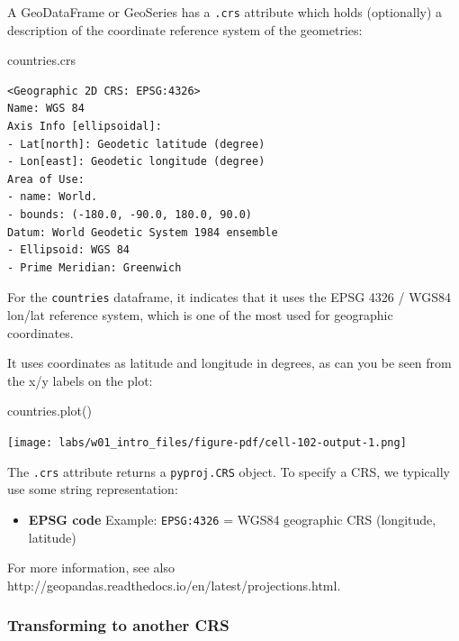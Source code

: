 \documentclass[
  letterpaper,
  DIV=11,
  numbers=noendperiod]{scrreprt}
\newenvironment{Shaded}{\begin{snugshade}}{\end{snugshade}}
\newcommand{\NormalTok}[1]{\textcolor[rgb]{0.00,0.23,0.31}{#1}}
\providecommand{\tightlist}{%
  \setlength{\itemsep}{0pt}\setlength{\parskip}{0pt}}\usepackage{longtable,booktabs,array}
\begin{document}
A GeoDataFrame or GeoSeries has a \texttt{.crs} attribute which holds
(optionally) a description of the coordinate reference system of the
geometries:

\begin{Shaded}
\begin{Highlighting}[]
\NormalTok{countries.crs}
\end{Highlighting}
\end{Shaded}

\begin{verbatim}
<Geographic 2D CRS: EPSG:4326>
Name: WGS 84
Axis Info [ellipsoidal]:
- Lat[north]: Geodetic latitude (degree)
- Lon[east]: Geodetic longitude (degree)
Area of Use:
- name: World.
- bounds: (-180.0, -90.0, 180.0, 90.0)
Datum: World Geodetic System 1984 ensemble
- Ellipsoid: WGS 84
- Prime Meridian: Greenwich
\end{verbatim}

For the \texttt{countries} dataframe, it indicates that it uses the EPSG
4326 / WGS84 lon/lat reference system, which is one of the most used for
geographic coordinates.

It uses coordinates as latitude and longitude in degrees, as can you be
seen from the x/y labels on the plot:

\begin{Shaded}
\begin{Highlighting}[]
\NormalTok{countries.plot()}
\end{Highlighting}
\end{Shaded}

\texttt{[image: labs/w01\_intro\_files/figure-pdf/cell-102-output-1.png]}

The \texttt{.crs} attribute returns a \texttt{pyproj.CRS} object. To
specify a CRS, we typically use some string representation:

\begin{itemize}
\tightlist
\item
  \textbf{EPSG code} Example: \texttt{EPSG:4326} = WGS84 geographic CRS
  (longitude, latitude)
\end{itemize}

For more information, see also
http://geopandas.readthedocs.io/en/latest/projections.html.

\subsubsection{Transforming to another
CRS}\label{transforming-to-another-crs}
\end{document}
